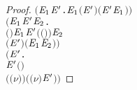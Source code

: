 \begin{proof}
\begin{alltt}
       \ensuremath{(}\HOLSymConst{\HOLTokenForall{}}  \ensuremath{\HOLBoundVar{E}\sb{\mathrm{1}}} \ensuremath{\HOLBoundVar{E}\sp{\prime}}.    \ensuremath{\HOLBoundVar{E}\sb{\mathrm{1}}} \HOLSymConst{\HOLTokenImp{}}  \ensuremath{(}\ensuremath{\HOLBoundVar{E}\sp{\prime}} \HOLSymConst{\ensuremath{\mid}} \ensuremath{)}  \ensuremath{(}\ensuremath{\HOLBoundVar{E}\sp{\prime}} \HOLSymConst{\ensuremath{\mid}} \ensuremath{\HOLBoundVar{E}\sb{\mathrm{1}}}\ensuremath{)}\ensuremath{)} \HOLSymConst{\HOLTokenConj{}}
       \ensuremath{(}\HOLSymConst{\HOLTokenForall{}}  \ensuremath{\HOLBoundVar{E}\sb{\mathrm{1}}} \ensuremath{\HOLBoundVar{E}\sp{\prime}} \ensuremath{\HOLBoundVar{E}\sb{\mathrm{2}}}.
              \ensuremath{(} \ensuremath{)} \ensuremath{\HOLBoundVar{E}\sb{\mathrm{1}}} \HOLSymConst{\HOLTokenConj{}}  \ensuremath{\HOLBoundVar{E}\sp{\prime}} \ensuremath{(} \ensuremath{(} \ensuremath{)}\ensuremath{)} \ensuremath{\HOLBoundVar{E}\sb{\mathrm{2}}} \HOLSymConst{\HOLTokenImp{}}
             \ensuremath{(} \HOLSymConst{\ensuremath{\mid}} \ensuremath{\HOLBoundVar{E}\sp{\prime}}\ensuremath{)} \HOLSymConst{\ensuremath{\tau}} \ensuremath{(}\ensuremath{\HOLBoundVar{E}\sb{\mathrm{1}}} \HOLSymConst{\ensuremath{\mid}} \ensuremath{\HOLBoundVar{E}\sb{\mathrm{2}}}\ensuremath{)}\ensuremath{)} \HOLSymConst{\HOLTokenConj{}}
       \ensuremath{(}\HOLSymConst{\HOLTokenForall{}}  \ensuremath{\HOLBoundVar{E}\sp{\prime}}  .
               \ensuremath{\HOLBoundVar{E}\sp{\prime}} \HOLSymConst{\HOLTokenConj{}} \ensuremath{(} \HOLSymConst{\ensuremath{=}} \HOLSymConst{\ensuremath{\tau}} \HOLSymConst{\HOLTokenDisj{}}  \HOLSymConst{\ensuremath{=}}   \HOLSymConst{\HOLTokenConj{}}  \HOLSymConst{\HOLTokenNotIn{}}  \HOLSymConst{\HOLTokenConj{}}   \HOLSymConst{\HOLTokenNotIn{}} \ensuremath{)} \HOLSymConst{\HOLTokenImp{}}
             \ensuremath{(}\ensuremath{(\nu}\ensuremath{)} \ensuremath{)}  \ensuremath{(}\ensuremath{(\nu}\ensuremath{)} \ensuremath{\HOLBoundVar{E}\sp{\prime}}\ensuremath{)}\ensuremath{)} \HOLSymConst{\HOLTokenConj{}}

\end{alltt}
\end{proof}
